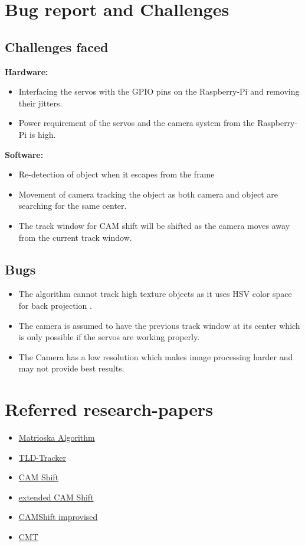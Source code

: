 \documentclass[a4paper,12pt,oneside]{book}
\begin{document}
\section{Bug report and Challenges}
\subsection{Challenges faced}
 \textbf{Hardware:}
 \begin{itemize}
  \item Interfacing the servos with the GPIO pins on the Raspberry-Pi and removing their jitters.
   \item Power requirement of the servos and the camera system from the Raspberry-Pi is high.
 \end{itemize}
 \vspace{0.3cm}
 \textbf{Software:}
 \begin{itemize}
     \item Re-detection of object when it escapes from the frame
     \item Movement of camera tracking the object as both camera and object are searching for the same center.
     \item The track window for CAM shift will be shifted as the camera moves away from the current track window.
 \end{itemize}
 \subsection{Bugs}
  \begin{itemize}
   \item The algorithm cannot track high texture objects as it uses HSV color space for back projection .
   \item The camera is assumed to have the previous track window at its center which is only possible if the servos are working properly.
   \item The Camera has a low resolution which makes image processing harder and may not provide best results.
  \end{itemize}
 \section{Referred research-papers}
 \begin{itemize}
     \item \href{http://www.cv-foundation.org/openaccess/content_cvpr_workshops_2014/W18/papers/Maresca_The_Matrioska_Tracking_2014_CVPR_paper.pdf}{Matrioska Algorithm}
     \item \href{http://kahlan.eps.surrey.ac.uk/featurespace/tld/Publications/2011_tpami}{TLD-Tracker}
     \item \href{http://www.jku.at/cg/content/e60566/e155475/e155539/FRCAMShift.pdf}{CAM Shift}
     \item \href{https://e-pub.uni-weimar.de/opus4/files/1410/CAMSHift.pdf}{extended CAM Shift}
     \item \href{http://isyou.info/inpra/papers/inpra-v2n2-05.pdf}{CAMShift improvised}
     \item \href{http://www.gnebehay.com/cmt/}{CMT}
 \end{itemize}
  
\end{document}
